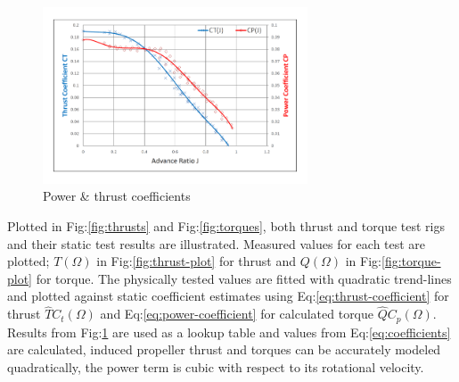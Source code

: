 \begin{figure}[htpb]
\vspace{-12pt}
\centering
\includegraphics[width=0.7\textwidth]{graphs/coeffs-plot}
\vspace{-12pt}
\caption{Power \& thrust coefficients}
\vspace{-16pt}
\label{fig:coeffs-plot}
\end{figure}
\par
Plotted in Fig:\ref{fig:thrusts} and Fig:\ref{fig:torques}, both thrust and torque test rigs and their static test results are illustrated. Measured values for each test are plotted; {\color{Red}$T(\Omega)$} in Fig:\ref{fig:thrust-plot} for thrust and {\color{Red}$Q(\Omega)$} in Fig:\ref{fig:torque-plot} for torque. The physically tested values are fitted with quadratic trend-lines and plotted against static coefficient estimates using Eq:\ref{eq:thrust-coefficient} for thrust {\color{LimeGreen}$\hat{T}C_t(\Omega)$} and Eq:\ref{eq:power-coefficient} for calculated torque {\color{LimeGreen}$\hat{Q}C_p(\Omega)$}. Results from Fig:\ref{fig:coeffs-plot} are used as a lookup table and values from Eq:\ref{eq:coefficients} are calculated, induced propeller thrust and torques can be accurately modeled quadratically, the power term is cubic with respect to its rotational velocity. 
